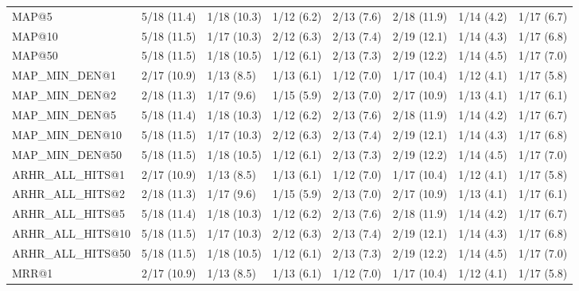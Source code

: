 \begin{tabular}{llllllll}
MAP@5                       &     5/18 (11.4) &      1/18 (10.3) &  1/12 (6.2) &  2/13 (7.6) &  2/18 (11.9) &     1/14 (4.2) &            1/17 (6.7) \\
MAP@10                      &     5/18 (11.5) &      1/17 (10.3) &  2/12 (6.3) &  2/13 (7.4) &  2/19 (12.1) &     1/14 (4.3) &            1/17 (6.8) \\
MAP@50                      &     5/18 (11.5) &      1/18 (10.5) &  1/12 (6.1) &  2/13 (7.3) &  2/19 (12.2) &     1/14 (4.5) &            1/17 (7.0) \\
MAP_MIN_DEN@1               &     2/17 (10.9) &       1/13 (8.5) &  1/13 (6.1) &  1/12 (7.0) &  1/17 (10.4) &     1/12 (4.1) &            1/17 (5.8) \\
MAP_MIN_DEN@2               &     2/18 (11.3) &       1/17 (9.6) &  1/15 (5.9) &  2/13 (7.0) &  2/17 (10.9) &     1/13 (4.1) &            1/17 (6.1) \\
MAP_MIN_DEN@5               &     5/18 (11.4) &      1/18 (10.3) &  1/12 (6.2) &  2/13 (7.6) &  2/18 (11.9) &     1/14 (4.2) &            1/17 (6.7) \\
MAP_MIN_DEN@10              &     5/18 (11.5) &      1/17 (10.3) &  2/12 (6.3) &  2/13 (7.4) &  2/19 (12.1) &     1/14 (4.3) &            1/17 (6.8) \\
MAP_MIN_DEN@50              &     5/18 (11.5) &      1/18 (10.5) &  1/12 (6.1) &  2/13 (7.3) &  2/19 (12.2) &     1/14 (4.5) &            1/17 (7.0) \\
ARHR_ALL_HITS@1             &     2/17 (10.9) &       1/13 (8.5) &  1/13 (6.1) &  1/12 (7.0) &  1/17 (10.4) &     1/12 (4.1) &            1/17 (5.8) \\
ARHR_ALL_HITS@2             &     2/18 (11.3) &       1/17 (9.6) &  1/15 (5.9) &  2/13 (7.0) &  2/17 (10.9) &     1/13 (4.1) &            1/17 (6.1) \\
ARHR_ALL_HITS@5             &     5/18 (11.4) &      1/18 (10.3) &  1/12 (6.2) &  2/13 (7.6) &  2/18 (11.9) &     1/14 (4.2) &            1/17 (6.7) \\
ARHR_ALL_HITS@10            &     5/18 (11.5) &      1/17 (10.3) &  2/12 (6.3) &  2/13 (7.4) &  2/19 (12.1) &     1/14 (4.3) &            1/17 (6.8) \\
ARHR_ALL_HITS@50            &     5/18 (11.5) &      1/18 (10.5) &  1/12 (6.1) &  2/13 (7.3) &  2/19 (12.2) &     1/14 (4.5) &            1/17 (7.0) \\
MRR@1                       &     2/17 (10.9) &       1/13 (8.5) &  1/13 (6.1) &  1/12 (7.0) &  1/17 (10.4) &     1/12 (4.1) &            1/17 (5.8) \\

\end{tabular}

